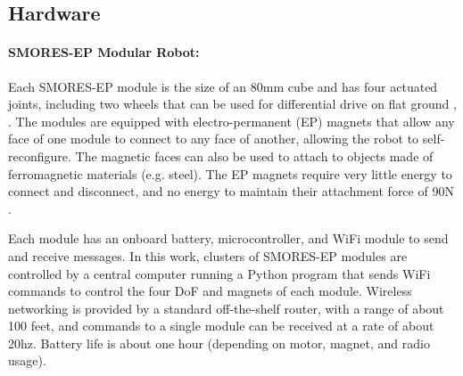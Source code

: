\documentclass[12pt]{article}
\begin{document}
%


\subsection{Hardware} %
\label{sec:hardware}
%
\paragraph{SMORES-EP Modular Robot:} \label{sec:smores}
%
Each SMORES-EP module is the size of an 80mm cube
and has four actuated joints, including two wheels that can be
used for differential drive on flat ground \cite{tosun2016design},
\cite{tosun2017paintpots}.  The modules are equipped
with electro-permanent (EP) magnets that allow any face of one module to connect to
any face of another, allowing the robot to self-reconfigure. The magnetic faces
can also be used to attach to objects made of ferromagnetic materials (e.g. steel). 
The EP magnets require very little energy to connect and disconnect, and no energy to maintain their attachment force of 90N \cite{tosun2016design}.

Each module has an onboard battery, microcontroller, and WiFi
module to send and receive messages.  In this work, clusters of SMORES-EP
modules are controlled by a central computer running a Python program that
sends WiFi commands to control the four DoF and magnets of each module.
Wireless networking is provided by a standard off-the-shelf  router, with a range of about 100 feet, and commands to a single module can be received at a rate of about 20hz.
Battery life is about one hour (depending on motor, magnet, and radio usage).

%

%
\end{document}
